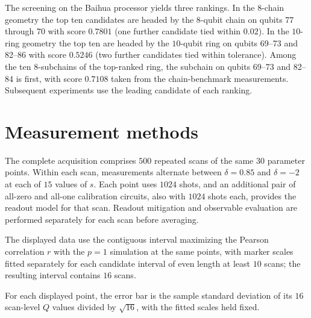 The screening on the Baihua processor yields three rankings. In the
$8$-chain geometry the top ten candidates are headed by the
$8$-qubit chain on qubits 77 through 70 with score $0.7801$ (one further
candidate tied within $0.02$). In the $10$-ring geometry the top ten are
headed by the $10$-qubit ring on qubits 69--73 and 82--86 with score
$0.5246$ (two further candidates tied within tolerance). Among the ten
$8$-subchains of the top-ranked ring, the subchain on qubits
69--73 and 82--84 is first, with score $0.7108$ taken from the
chain-benchmark measurements. Subsequent experiments use the
leading candidate of each ranking.



\section{Measurement methods}
\label{sec:acquisition}

The complete acquisition comprises $500$ repeated scans of the same $30$ parameter points.
Within each scan, measurements alternate between $\delta=0.85$ and $\delta=-2$ at each of $15$ values of $s$.
Each point uses $1024$ shots, and an additional pair of all-zero and all-one calibration circuits, also with $1024$ shots each, provides the readout model for that scan.
Readout mitigation and observable evaluation are performed separately for each scan before averaging.

The displayed data use the contiguous interval maximizing the Pearson correlation $r$ with the $p=1$ simulation at the same points, with marker scales fitted separately for each candidate interval of even length at least $10$ scans; the resulting interval contains $16$ scans.

For each displayed point, the error bar is the sample standard deviation of its $16$ scan-level $Q$ values divided by $\sqrt{16}$, with the fitted scales held fixed.

